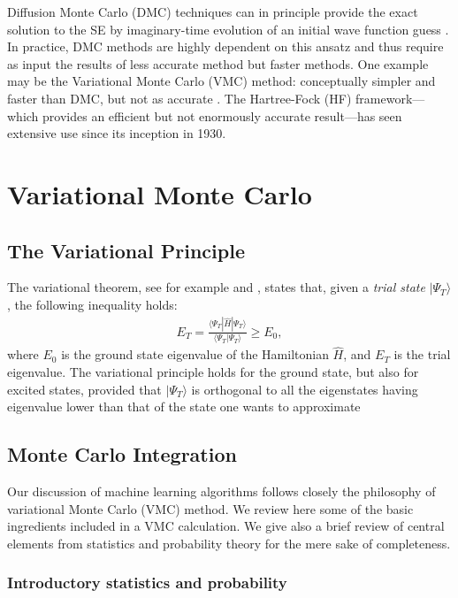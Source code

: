 \documentclass[twoside,english]{uiofysmaster}
\begin{document}
Diffusion Monte Carlo (DMC) techniques can in principle provide the
exact solution to the SE by imaginary-time evolution of an initial
wave function guess \cite{HjortJensen2015,Hammond1994}.  In practice,
DMC methods are highly dependent on this ansatz and thus require as
input the results of less accurate method but faster methods. One
example may be the Variational Monte Carlo (VMC) method: conceptually
simpler and faster than DMC, but not as accurate \cite{Hammond1994}.
The Hartree-Fock (HF) framework—which provides an 
efficient but not enormously accurate result—has seen extensive use since its inception in 1930.

\section{Variational Monte Carlo}
\subsection{The Variational Principle}
The variational theorem,  see for example \cite{Kvaal2017} and \cite{Helgaker2000}, states that,
given a \textit{trial state} $| \Psi_T \rangle$, the following inequality holds:
\begin{align}
	E_T = \frac{ \langle \Psi_T | \hat{H} | \Psi_T \rangle }{ \langle \Psi_T |\Psi_T \rangle } \geq E_0,
\end{align}
where $E_0$ is the ground state eigenvalue of the Hamiltonian
$\hat{H}$, and $E_T$ is the trial eigenvalue. The variational
principle holds for the ground state, but also for excited states,
provided that $|\Psi_T \rangle$ is orthogonal to all the eigenstates
having eigenvalue lower than that of the state one wants to
approximate \cite{HjortJensen2017}

\subsection{Monte Carlo Integration}
Our discussion of machine learning algorithms follows closely the philosophy of variational Monte Carlo (VMC) method.  We review here some of the basic ingredients included in a VMC calculation. We give also a brief review of central elements from statistics and probability theory for the mere sake of completeness.

\subsubsection{Introductory statistics and probability}
\end{document}
